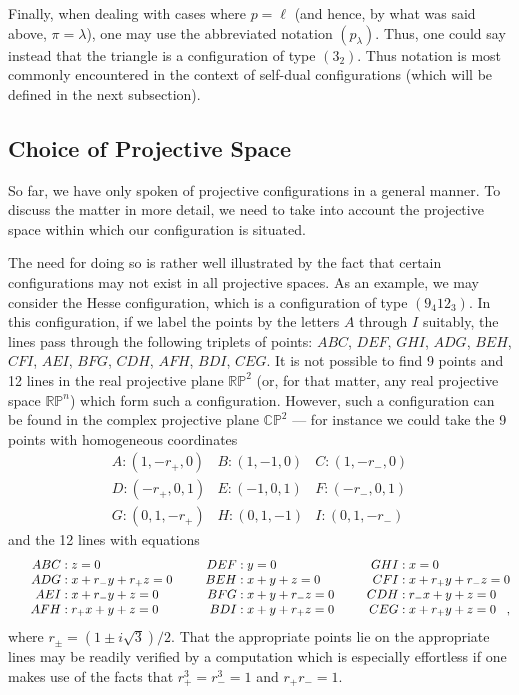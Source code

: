 \documentclass[12pt]{article}
\begin{document}
Finally, when dealing with cases where $p = \ell$ (and hence,
by what was said above, $\pi = \lambda$), one may use the
abbreviated notation $(p_\lambda)$.  Thus, one could say 
instead that the triangle is a configuration of type $(3_2)$.
Thus notation is most commonly encountered in the context
of self-dual configurations (which will be defined in the
next subsection). 

\subsection{Choice of Projective Space}

So far, we have only spoken of projective configurations in a
general manner.  To discuss the matter in more detail, we need 
to take into account the projective space within which our
configuration is situated.

The need for doing so is rather well illustrated by the fact 
that certain configurations may not exist in all projective
spaces.  As an example, we may consider the Hesse configuration,
which is a configuration of type $(9_4 12_3)$.  In this
configuration, if we label the points by the letters $A$ through
$I$ suitably, the lines pass through the following triplets of
points: $ABC$, $DEF$, $GHI$, $ADG$, $BEH$, $CFI$, $AEI$, $BFG$,
$CDH$, $AFH$, $BDI$, $CEG$.  It is not possible to find 9 points
and 12 lines in the real projective plane $\mathbb{R} \mathbb{P}^2$
(or, for that matter, any real projective space $\mathbb{R} 
\mathbb{P}^n$) which form such a configuration.  However, such
a configuration can be found in the complex projective plane
$\mathbb{C} \mathbb{P}^2$ --- for instance we could take the
9 points with homogeneous coordinates
\[ \begin{matrix}
 A: ( 1, -r_+, 0 ) &
 B: ( 1, -1, 0 ) &
 C: ( 1, -r_-, 0 ) \\
 D: ( -r_+, 0, 1 ) &
 E: ( -1, 0, 1 ) &
 F: ( -r_-, 0, 1 ) \\
 G: ( 0, 1, -r_+) &
 H: ( 0, 1,-1 ) &
 I: ( 0, 1, -r_- )
\end{matrix} \]
and the 12 lines with equations
\[ \begin{matrix}
 \hbox to 50pt{$\hfil ABC:\;$} z = 0 \hfill & 
 \hbox to 50pt{$\hfil DEF:\;$} y = 0 \hfill & 
 \hbox to 50pt{$\hfil GHI:\;$} x = 0 \hfill \\
 \hbox to 50pt{$\hfil ADG:\;$} x + r_- y + r_+ z = 0 \hfill &
 \hbox to 50pt{$\hfil BEH:\;$} x + y + z = 0 \hfill &
 \hbox to 50pt{$\hfil CFI:\;$} x + r_+ y + r_- z = 0 \hfill \\
 \hbox to 50pt{$\hfil AEI:\;$} x + r_- y + z = 0 \hfill &
 \hbox to 50pt{$\hfil BFG:\;$} x + y + r_- z = 0 \hfill &
 \hbox to 50pt{$\hfil CDH:\;$} r_- x + y + z = 0 \hfill \\
 \hbox to 50pt{$\hfil AFH:\;$} r_+ x + y + z = 0 \hfill &
 \hbox to 50pt{$\hfil BDI:\;$} x + y + r_+ z = 0 \hfill &
 \hbox to 50pt{$\hfil CEG:\;$} x + r_+ y + z = 0 \hfill ,
\end{matrix} \]
where $r_\pm = (1 \pm i \sqrt{3})/2$.  That the appropriate points
lie on the appropriate lines may be readily verified by a computation
which is especially effortless if one makes use of the facts that
$r_+^3 = r_-^3 = 1$ and $r_+ r_- = 1$.
\end{document}
